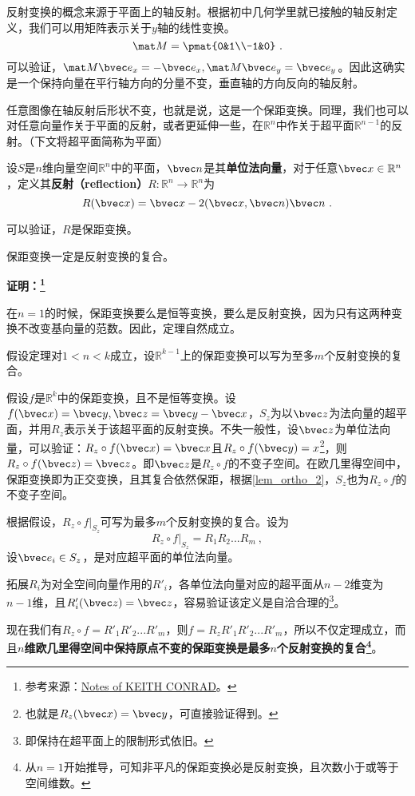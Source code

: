 
反射变换的概念来源于平面上的轴反射。根据初中几何学里就已接触的轴反射定义，我们可以用矩阵表示关于$y$轴的线性变换。
\begin{equation}
\mat M=\pmat{0&1\\-1&0}~.
\end{equation}
可以验证，$\mat M\bvec e_x=-\bvec e_x,\mat M \bvec e_y=\bvec e_y$。因此这确实是一个保持向量在平行轴方向的分量不变，垂直轴的方向反向的轴反射。

任意图像在轴反射后形状不变，也就是说，这是一个保距变换。同理，我们也可以对任意向量作关于平面的反射，或者更延伸一些，在$\mathbb R^n$中作关于超平面$\mathbb R^{n-1}$的反射。（下文将超平面简称为平面）
\begin{definition}{}
设$S$是$n$维向量空间$\mathbb R^n$中的平面，$\bvec n$是其\textbf{单位法向量}，对于任意$\bvec x\in \mathbb R^n$，定义其\textbf{反射（reflection）}$R:\mathbb R^n\rightarrow \mathbb R^n$为
\begin{equation}
R(\bvec x)=\bvec x-2(\bvec x,\bvec n)\bvec n~.
\end{equation}
\end{definition}
可以验证，$R$是保距变换。


\begin{theorem}{}
保距变换一定是反射变换的复合。
\end{theorem}
\textbf{证明：\footnote{参考来源：\href{https://kconrad.math.uconn.edu/blurbs/grouptheory/isometryRn.pdf}{Notes of KEITH CONRAD}。}}

在$n=1$的时候，保距变换要么是恒等变换，要么是反射变换，因为只有这两种变换不改变基向量的范数。因此，定理自然成立。

假设定理对$1<n<k$成立，设$\mathbb R^{k-1}$上的保距变换可以写为至多$m$个反射变换的复合。 

假设$f$是$\mathbb R^k$中的保距变换，且不是恒等变换。设$f(\bvec x)=\bvec y,\bvec z=\bvec y-\bvec x$，$S_z$为以$\bvec z$为法向量的超平面，并用$R_z$表示关于该超平面的反射变换。不失一般性，设$\bvec z$为单位法向量，可以验证：$R_z\circ f(\bvec x)=\bvec x$且$R_z\circ f(\bvec y)=x$\footnote{也就是$R_z(\bvec x)=\bvec y$，可直接验证得到。}，则$R_z\circ f(\bvec z)=\bvec z$。即$\bvec z$是$R_z\circ f$的不变子空间。在欧几里得空间中，保距变换即为正交变换，且其复合依然保距，根据\autoref{lem_ortho_2}，$S_z$也为$R_z\circ f$的不变子空间。

根据假设，$R_z\circ f|_{S_z}$可写为最多$m$个反射变换的复合。设为
\begin{equation}
R_z\circ f|_{S_z}=R_1R_2...R_{m}~,
\end{equation}
设$\bvec e_i\in S_z$，是对应超平面的单位法向量。

拓展$R_i$为对全空间向量作用的$R'_i$，各单位法向量对应的超平面从$n-2$维变为$n-1$维，且$R'_i(\bvec z)=\bvec z$，容易验证该定义是自洽合理的\footnote{即保持在超平面上的限制形式依旧。}。

现在我们有$R_z \circ f=R'_1R'_2...R'_{m}$，则$f=R_zR'_1R'_2...R'_{m}$，所以不仅定理成立，而且\textbf{$n$维欧几里得空间中保持原点不变的保距变换是最多$n$个反射变换的复合\footnote{从$n=1$开始推导，可知非平凡的保距变换必是反射变换，且次数小于或等于空间维数。}}。

